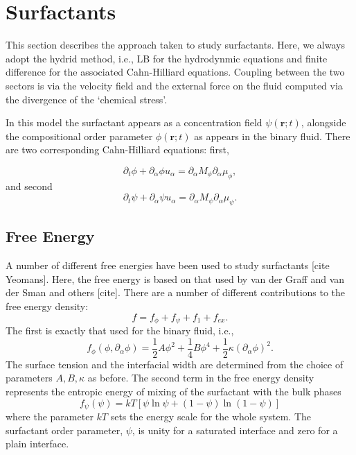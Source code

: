 %
%
%

\section{Surfactants}

This section describes the approach taken to study surfactants. Here,
we always adopt the hydrid method, i.e., LB for the hydrodynmic
equations and finite difference for the associated Cahn-Hilliard
equations. Coupling between the two sectors is via the velocity
field and the external force on the fluid computed via the
divergence of the `chemical stress'.

In this model the surfactant appears as a concentration field
$\psi(\mathbf{r};t)$, alongside the compositional order parameter
$\phi(\mathbf{r};t)$ as appears in the binary fluid. There are
two corresponding Cahn-Hilliard equations: first,

\begin{equation}
\partial_t \phi + \partial_\alpha \phi u_\alpha = 
\partial_\alpha M_\phi \partial_\alpha \mu_\phi,
\end{equation}
and second
\begin{equation}
\partial_t \psi + \partial_\alpha \psi u_\alpha = 
\partial_\alpha M_\psi \partial_\alpha \mu_\psi.
\end{equation}

\subsection{Free Energy}

A number of different free energies have been used to study
surfactants [cite Yeomans]. Here, the free energy is based on
that used by van der Graff and van der Sman and others [cite].
There are a number of different contributions to the free
energy density:
\begin{equation}
f = f_\phi + f_\psi +f_1 + f_{ex}.
\end{equation}
The first is exactly that used for the binary fluid, i.e.,
\begin{equation}
f_\phi (\phi, \partial_\alpha\phi) =
{\textstyle \frac{1}{2}} A \phi^2 + {\textstyle \frac{1}{4}} B \phi^4
+ {\textstyle \frac{1}{2}} \kappa (\partial_\alpha \phi)^2.
\end{equation}
The surface tension and the interfacial width are determined from the
choice of parameters $A,B,\kappa$ as before.
The second term in the free energy density
represents the entropic
energy of mixing of the surfactant with the bulk phases
\begin{equation}
f_\psi (\psi) = kT \left[ \psi \ln\psi + (1 - \psi)\ln(1-\psi) \right]
\end{equation}
where the parameter $kT$ sets the energy scale for the whole system.
The surfactant order parameter, $\psi$, is unity for a saturated
interface and zero for a plain interface.


